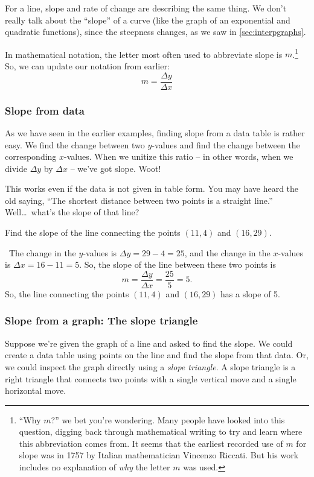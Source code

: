 For a line, slope and rate of change are describing the same thing. We don't really talk about the ``slope'' of a curve (like the graph of an exponential and quadratic functions), since the steepness changes, as we saw in \cref{sec:interpgraphs}.

In mathematical notation, the letter most often used to abbreviate slope is $m$.\footnote{``Why $m$?'' we bet you're wondering. Many people have looked into this question, digging back through mathematical writing to try and learn where this abbreviation comes from. It seems that the earliest recorded use of $m$ for slope was in 1757 by Italian mathematician Vincenzo Riccati. But his work includes no explanation of \textit{why} the letter $m$ was used.} So, we can update our notation from earlier:
\[m = \frac{\Delta y}{\Delta x}\]

\subsubsection{Slope from data}

As we have seen in the earlier examples, finding slope from a data table is rather easy. We find the change between two $y$-values and find the change between the corresponding $x$-values. When we unitize this ratio -- in other words, when we divide $\Delta y$ by $\Delta x$ -- we've got slope. Woot!

This works even if the data is not given in table form. You may have heard the old saying, ``The shortest distance between two points is a straight line.'' Well\ldots\ what's the slope of that line?

\begin{boxex}
Find the slope of the line connecting the points $(11, 4)$ and $(16, 29)$.

\exsoln\ The change in the $y$-values is $\Delta y = 29-4 = 25$, and the change in the $x$-values is $\Delta x = 16-11=5$. So, the slope of the line between these two points is \[m = \frac{\Delta y}{\Delta x} = \frac{25}{5} = 5.\]
So, the line connecting the points $(11, 4)$ and $(16, 29)$ has a slope of 5.
\end{boxex}

\subsubsection{Slope from a graph: The slope triangle}

Suppose we're given the graph of a line and asked to find the slope. We could create a data table using points on the line and find the slope from that data. Or, we could inspect the graph directly using a \textit{slope triangle}. A slope triangle is a right triangle that connects two points with a single vertical move and a single horizontal move.

